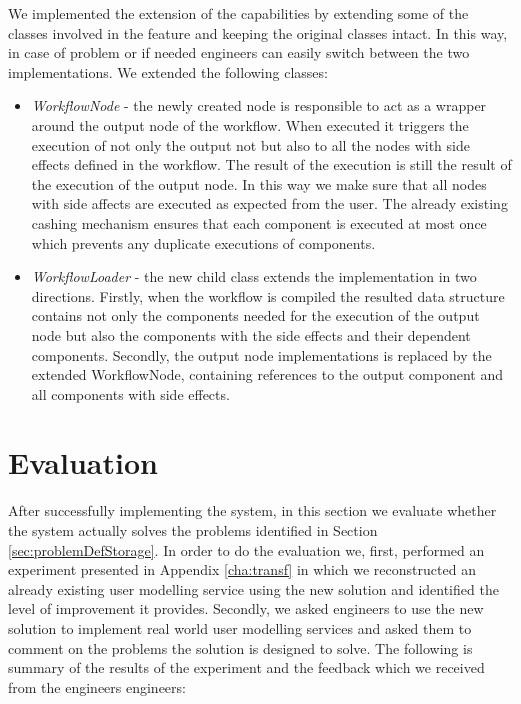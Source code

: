 We implemented the extension of the capabilities by extending some of the classes involved in the feature and keeping the original classes intact. In this way, in case of problem or if needed engineers can easily switch between the two implementations. We extended the following classes:

\begin{itemize}
	\item \textit{WorkflowNode} - the newly created node is responsible to act as a wrapper around the output node of the workflow. When executed it triggers the execution of not only the output not but also to all the nodes with side effects defined in the workflow. The result of the execution is still the result of the execution of the output node. In this way we make sure that all nodes with side affects are executed as expected from the user. The already existing cashing mechanism ensures that each component is executed at most once which prevents any duplicate executions of components.
	
	\item \textit{WorkflowLoader} - the new child class extends the implementation in two directions. Firstly, when the workflow is compiled the resulted data structure contains not only the components needed for the execution of the output node but also the components with the side effects and their dependent components. Secondly, the output node implementations is replaced by the extended WorkflowNode, containing references to the output component and all components with side effects.
\end{itemize}


\section{Evaluation} 
\label{sec:evalStorage}

After successfully implementing the system, in this section we evaluate whether the system actually solves the problems identified in Section \ref{sec:problemDefStorage}. In order to do the evaluation we, first, performed an experiment presented in Appendix \ref{cha:transf} in which we reconstructed an already existing user modelling service using the new solution and identified the level of improvement it provides. Secondly, we asked engineers to use the new solution to implement real world user modelling services and asked them to comment on the problems the solution is designed to solve. The following is summary of the results of the experiment and the feedback which we received from the engineers engineers:

